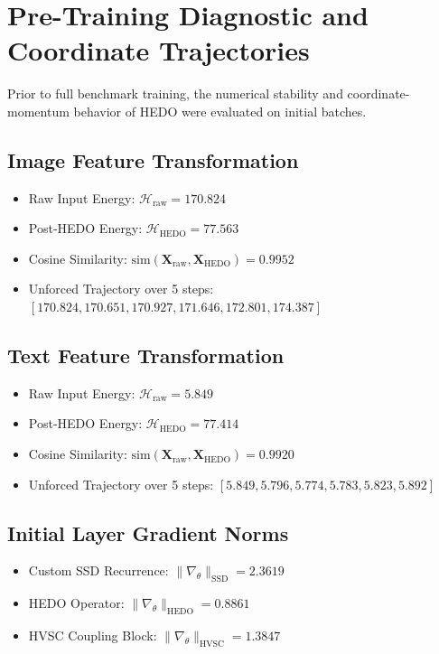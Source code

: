 \documentclass[journal]{IEEEtran}
\begin{document}
\section{Pre-Training Diagnostic and Coordinate Trajectories}
Prior to full benchmark training, the numerical stability and coordinate-momentum behavior of HEDO were evaluated on initial batches.

\subsection{Image Feature Transformation}
\begin{itemize}
    \item Raw Input Energy: $\mathcal{H}_{\text{raw}} = 170.824$
    \item Post-HEDO Energy: $\mathcal{H}_{\text{HEDO}} = 77.563$
    \item Cosine Similarity: $\text{sim}(\mathbf{X}_{\text{raw}}, \mathbf{X}_{\text{HEDO}}) = 0.9952$
    \item Unforced Trajectory over 5 steps: $[170.824, 170.651, 170.927, 171.646, 172.801, 174.387]$
\end{itemize}

\subsection{Text Feature Transformation}
\begin{itemize}
    \item Raw Input Energy: $\mathcal{H}_{\text{raw}} = 5.849$
    \item Post-HEDO Energy: $\mathcal{H}_{\text{HEDO}} = 77.414$
    \item Cosine Similarity: $\text{sim}(\mathbf{X}_{\text{raw}}, \mathbf{X}_{\text{HEDO}}) = 0.9920$
    \item Unforced Trajectory over 5 steps: $[5.849, 5.796, 5.774, 5.783, 5.823, 5.892]$
\end{itemize}

\subsection{Initial Layer Gradient Norms}
\begin{itemize}
    \item Custom SSD Recurrence: $\|\nabla_{\theta}\|_{\text{SSD}} = 2.3619$
    \item HEDO Operator: $\|\nabla_{\theta}\|_{\text{HEDO}} = 0.8861$
    \item HVSC Coupling Block: $\|\nabla_{\theta}\|_{\text{HVSC}} = 1.3847$
\end{itemize}
\end{document}
